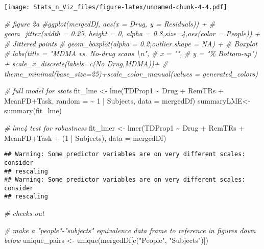 \documentclass[
]{article}
\newenvironment{Shaded}{\begin{snugshade}}{\end{snugshade}}
\newcommand{\AttributeTok}[1]{\textcolor[rgb]{0.77,0.63,0.00}{#1}}
\newcommand{\CommentTok}[1]{\textcolor[rgb]{0.56,0.35,0.01}{\textit{#1}}}
\newcommand{\DecValTok}[1]{\textcolor[rgb]{0.00,0.00,0.81}{#1}}
\newcommand{\FunctionTok}[1]{\textcolor[rgb]{0.00,0.00,0.00}{#1}}
\newcommand{\NormalTok}[1]{#1}
\newcommand{\OtherTok}[1]{\textcolor[rgb]{0.56,0.35,0.01}{#1}}
\newcommand{\SpecialCharTok}[1]{\textcolor[rgb]{0.00,0.00,0.00}{#1}}
\newcommand{\StringTok}[1]{\textcolor[rgb]{0.31,0.60,0.02}{#1}}
\begin{document}
\texttt{[image: Stats\_n\_Viz\_files/figure-latex/unnamed-chunk-4-4.pdf]}

\begin{Shaded}
\begin{Highlighting}[]
\CommentTok{\# figure 2a}
\CommentTok{\#ggplot(mergedDf, aes(x = Drug, y = Residuals)) +}
\CommentTok{\#  geom\_jitter(width = 0.25, height = 0, alpha = 0.8,size=4,aes(color = People)) +  \# Jittered points}
\CommentTok{\#  geom\_boxplot(alpha = 0.2,outlier.shape = NA) +     \# Boxplot}
\CommentTok{\#  labs(title = "MDMA vs. No{-}drug scans \textbackslash{}n",}
\CommentTok{\#       x = "",}
\CommentTok{\#       y = "\% Bottom{-}up") + scale\_x\_discrete(labels=c(\textquotesingle{}No Drug\textquotesingle{},\textquotesingle{}MDMA\textquotesingle{}))+}
\CommentTok{\#  theme\_minimal(base\_size=25)+scale\_color\_manual(values = generated\_colors)}

\CommentTok{\# full model for stats}
\NormalTok{fit\_lme }\OtherTok{\textless{}{-}} \FunctionTok{lme}\NormalTok{(TDProp1 }\SpecialCharTok{\textasciitilde{}}\NormalTok{ Drug }\SpecialCharTok{+}\NormalTok{ RemTRs }\SpecialCharTok{+}\NormalTok{ MeanFD}\SpecialCharTok{+}\NormalTok{Task, }\AttributeTok{random =} \SpecialCharTok{\textasciitilde{}} \DecValTok{1} \SpecialCharTok{|}\NormalTok{ Subjects, }\AttributeTok{data =}\NormalTok{ mergedDf)}
\NormalTok{summaryLME}\OtherTok{\textless{}{-}}\FunctionTok{summary}\NormalTok{(fit\_lme)}

\CommentTok{\# lme4 test for robustness}
\NormalTok{fit\_lmer }\OtherTok{\textless{}{-}} \FunctionTok{lmer}\NormalTok{(TDProp1 }\SpecialCharTok{\textasciitilde{}}\NormalTok{ Drug }\SpecialCharTok{+}\NormalTok{ RemTRs }\SpecialCharTok{+}\NormalTok{ MeanFD}\SpecialCharTok{+}\NormalTok{Task }\SpecialCharTok{+}\NormalTok{ (}\DecValTok{1} \SpecialCharTok{|}\NormalTok{ Subjects), }\AttributeTok{data =}\NormalTok{ mergedDf)}
\end{Highlighting}
\end{Shaded}

\begin{verbatim}
## Warning: Some predictor variables are on very different scales: consider
## rescaling
## Warning: Some predictor variables are on very different scales: consider
## rescaling
\end{verbatim}

\begin{Shaded}
\begin{Highlighting}[]
\CommentTok{\# checks out}

\CommentTok{\# make a "people"{-}"subjects" equivalence data frame to reference in figures down below}
\NormalTok{unique\_pairs }\OtherTok{\textless{}{-}} \FunctionTok{unique}\NormalTok{(mergedDf[}\FunctionTok{c}\NormalTok{(}\StringTok{"People"}\NormalTok{, }\StringTok{"Subjects"}\NormalTok{)])}
\end{Highlighting}
\end{Shaded}
\end{document}
